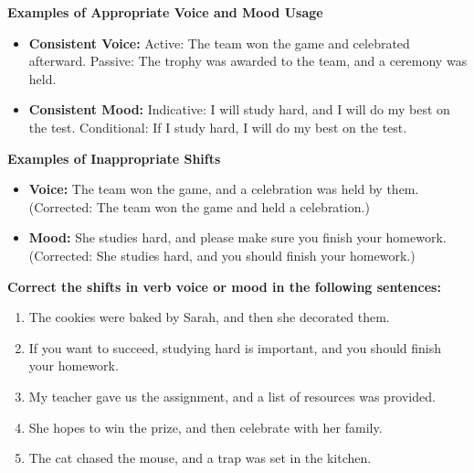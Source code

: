 \documentclass[12pt]{article}
\begin{document}
\vspace{1em}

\begin{tcolorbox}[colframe=black!60, colback=white, 
coltitle=black, colbacktitle=black!15, fonttitle=\bfseries\Large, 
title=Examples, halign title=center, left=10pt, right=10pt, top=10pt, bottom=15pt]

\textbf{Examples of Appropriate Voice and Mood Usage}
\begin{itemize}
    \item \textbf{Consistent Voice:}  
    Active: The team won the game and celebrated afterward.  
    Passive: The trophy was awarded to the team, and a ceremony was held.

    \item \textbf{Consistent Mood:}  
    Indicative: I will study hard, and I will do my best on the test.  
    Conditional: If I study hard, I will do my best on the test.  
\end{itemize}

\textbf{Examples of Inappropriate Shifts}
\begin{itemize}
    \item \textbf{Voice:} The team won the game, and a celebration was held by them.  
    (Corrected: The team won the game and held a celebration.)
    \item \textbf{Mood:} She studies hard, and please make sure you finish your homework.  
    (Corrected: She studies hard, and you should finish your homework.)
\end{itemize}

\end{tcolorbox}

\vspace{1em}

\begin{tcolorbox}[colframe=black!60, colback=white, 
coltitle=black, colbacktitle=black!15, fonttitle=\bfseries\Large, 
title=Guided Practice, halign title=center, left=10pt, right=10pt, top=10pt, bottom=15pt]
\textbf{Correct the shifts in verb voice or mood in the following sentences:}
\begin{enumerate}[itemsep=3em]
    \item The cookies were baked by Sarah, and then she decorated them.  
    \item If you want to succeed, studying hard is important, and you should finish your homework.  
    \item My teacher gave us the assignment, and a list of resources was provided.  
    \item She hopes to win the prize, and then celebrate with her family.  
    \item The cat chased the mouse, and a trap was set in the kitchen.  
\end{enumerate}
\end{tcolorbox}
\end{document}
